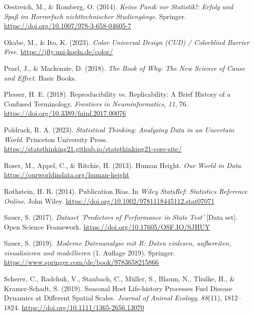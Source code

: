 \documentclass[
  letterpaper,
  oneside,
  open=any]{scrbook}
\newlength{\cslhangindent}
\newenvironment{CSLReferences}[2] %
 {\begin{list}{}{%
  \setlength{\itemindent}{0pt}
  \setlength{\leftmargin}{0pt}
  \setlength{\parsep}{0pt}
  \ifodd #1
   \setlength{\leftmargin}{\cslhangindent}
   \setlength{\itemindent}{-1\cslhangindent}
  \fi
  \setlength{\itemsep}{#2\baselineskip}}}
 {\end{list}}
\theoremstyle{definition}
\theoremstyle{definition}
\theoremstyle{definition}
\theoremstyle{remark}
\begin{document}
\begin{CSLReferences}{1}{0}
Oestreich, M., \& Romberg, O. (2014). \emph{Keine Panik vor Statistik!:
Erfolg und Spaß im Horrorfach nichttechnischer Studiengänge}. Springer.
\url{https://doi.org/10.1007/978-3-658-04605-7}

Okabe, M., \& Ito, K. (2023). \emph{Color {Universal Design} ({CUD}) /
{Colorblind Barrier Free}}. \url{https://jfly.uni-koeln.de/color/}

Pearl, J., \& Mackenzie, D. (2018). \emph{The Book of Why: The New
Science of Cause and Effect}. Basic Books.

Plesser, H. E. (2018). Reproducibility vs. {Replicability}: {A Brief
History} of a {Confused Terminology}. \emph{Frontiers in
Neuroinformatics}, \emph{11}, 76.
\url{https://doi.org/10.3389/fninf.2017.00076}

Poldrack, R. A. (2023). \emph{Statistical Thinking: Analyzing Data in an
Uncertain World}. Princeton University Press.
\url{https://statsthinking21.github.io/statsthinking21-core-site/}

Roser, M., Appel, C., \& Ritchie, H. (2013). Human Height. \emph{Our
World in Data}. \url{https://ourworldindata.org/human-height}

Rothstein, H. R. (2014). Publication {Bias}. In \emph{Wiley {StatsRef}:
{Statistics Reference Online}}. John Wiley.
\url{https://doi.org/10.1002/9781118445112.stat07071}

Sauer, S. (2017). \emph{Dataset 'Predictors of Performance in Stats
Test'} {[}Data set{]}. Open Science Framework.
\url{https://doi.org/10.17605/OSF.IO/SJHUY}

Sauer, S. (2019). \emph{Moderne Datenanalyse mit R: Daten einlesen,
aufbereiten, visualisieren und modellieren} (1. Auflage 2019). Springer.
\url{https://www.springer.com/de/book/9783658215866}

Scherer, C., Radchuk, V., Staubach, C., Müller, S., Blaum, N., Thulke,
H., \& Kramer‐Schadt, S. (2019). Seasonal Host Life‐history Processes
Fuel Disease Dynamics at Different Spatial Scales. \emph{Journal of
Animal Ecology}, \emph{88}(11), 1812--1824.
\url{https://doi.org/10.1111/1365-2656.13070}


\end{CSLReferences}
\end{document}
